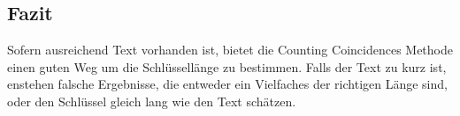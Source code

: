 \subsection{Fazit}
Sofern ausreichend Text vorhanden ist, bietet die Counting Coincidences Methode einen guten Weg um die Schlüssellänge
zu bestimmen. Falls der Text zu kurz ist, enstehen falsche Ergebnisse, die entweder ein Vielfaches der richtigen Länge sind,
oder den Schlüssel gleich lang wie den Text schätzen.